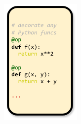 \documentclass{article} %
\begin{document}
\begin{figure}[h]
\centering
\begin{subfigure}{0.23\textwidth}
\centering
\includegraphics[width=\textwidth]{img/fig1.pdf}
\end{subfigure}
\begin{subfigure}{0.35\textwidth}
\centering

\end{subfigure}
\end{figure}
\end{document}
